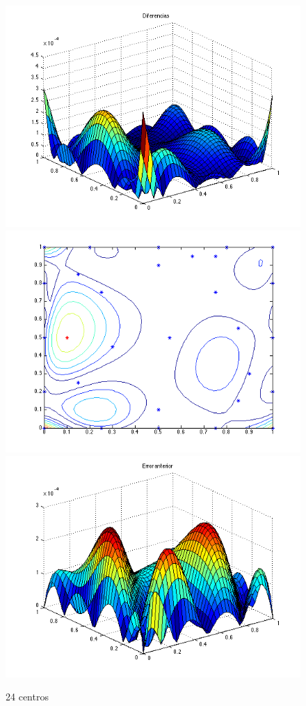 \documentclass[11pt,a4paper]{article}
\begin{document}
\begin{figure}[H]
\centering

\includegraphics[scale=0.35]{diferencias30.png}
\includegraphics[scale=0.35]{centros30.png}
\includegraphics[scale=0.35]{error30.png}
\caption{24 centros}
\end{figure}
\end{document}

